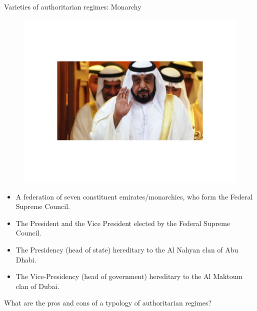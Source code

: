 \documentclass[10pt]{beamer}
\begin{document}
\begin{frame}{Varieties of authoritarian regimes: Monarchy}
	\begin{figure}
	\centering
    \includegraphics[scale=0.32]{Figs/Countries/uae}
	\end{figure}
	\pause
	\begin{itemize}
	\small
	\item A federation of seven constituent emirates/monarchies, who form the Federal Supreme Council.
	\item The President and the Vice President elected by the Federal Supreme Council.
	\item The Presidency (head of state) hereditary to the Al Nahyan clan of Abu Dhabi.
	\item The Vice-Presidency (head of government) hereditary to the Al Maktoum clan of Dubai.
	\end{itemize}
\end{frame}

\begin{frame}
What are the pros and cons of a typology of authoritarian regimes?
\end{frame}
\end{document}
